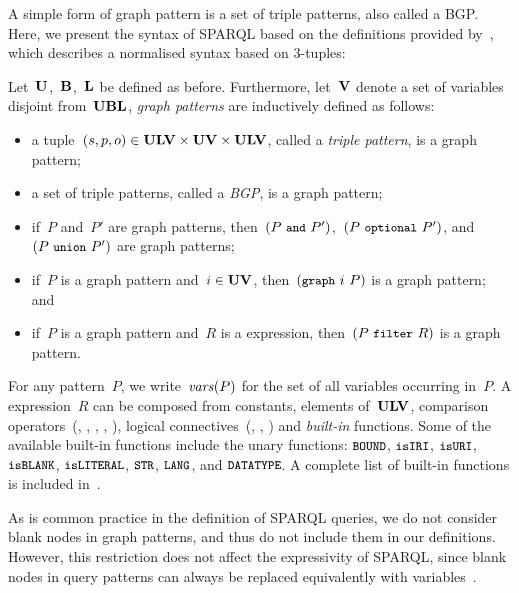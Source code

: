 A simple form of graph pattern is a set of triple patterns, also called a \ac{BGP}.
%
Here, we present the syntax of SPARQL based on the definitions provided by~\citet{PerezArenasGutierrez:2009aa}, which
describes a normalised syntax based on 3-tuples:
%
\begin{definition} 
  \label{def:graphpattern}
  Let~$\mathbf{U}$,~$\mathbf{B}$,~$\mathbf{L}$ be defined as before. Furthermore, let~$\mathbf{V}$ denote a set of variables disjoint from~$\mathbf{UBL}$,
  \emph{graph patterns} are inductively defined as follows:
  \begin{itemize}[noitemsep]
  \item a tuple~$(s,p,o) \in \mathbf{ULV} \times \mathbf{UV} \times \mathbf{ULV}$, called a \emph{triple pattern}, is a graph pattern;
  \item a set of triple patterns, called a \emph{\acf{BGP}}, is a graph pattern;
  \item if~$P$ and~$P'$ are graph patterns, then~$(P\ \AND\ P')$,~$(P\ \text{\OPTIONAL}\ P')$, and~$(P\ \text{\UNION}\ P')$ are graph
    patterns;
  \item if~$P$ is a graph pattern and~$i \in \mathbf{UV}$, then~$(\text{\texttt{{\small graph}}}\ i\ P)$ is a graph pattern; and
  \item if~$P$ is a graph pattern and~$R$ is a \FILTER expression, then~$(P\ \text{\FILTER}\ R)$ is a graph pattern.
  \end{itemize}
  For any pattern~$P$, we write~$\mathit{vars}\!\left(P\right)$ for the set of all variables occurring in~$P$.
  A \FILTER expression~$R$ can be composed from constants, elements of~$\mathbf{ULV}$, comparison operators~(\character{$=$},
  \character{$<$}, \character{$>$}, \character{$\leq$}, \character{$\geq$}), logical connectives~(\character{$\neg$},
  \character{$\land$}, \character{$\lor$}) and \emph{built-in} functions.
  Some of the available built-in functions include the unary functions: $\texttt{{\small BOUND}}$, $\texttt{{\small isIRI}}$,
  $\texttt{{\small isURI}}$, $\texttt{{\small isBLANK}}$, $\texttt{{\small isLITERAL}}$, $\texttt{{\small STR}}$, $\texttt{{\small LANG}}$, and
  $\texttt{{\small DATATYPE}}$.  A complete list of built-in functions is included
  in~\citet[Section~11]{PrudhommeauxSeaborne:2008aa}.
\end{definition}
%
\nd As is common practice in the definition of SPARQL queries, we do not consider blank nodes in graph patterns, and
thus do not include them in our definitions. However, this restriction does not affect the expressivity of SPARQL, since
blank nodes in query patterns can always be replaced equivalently with variables~\cite{PerezArenasGutierrez:2009aa}.
